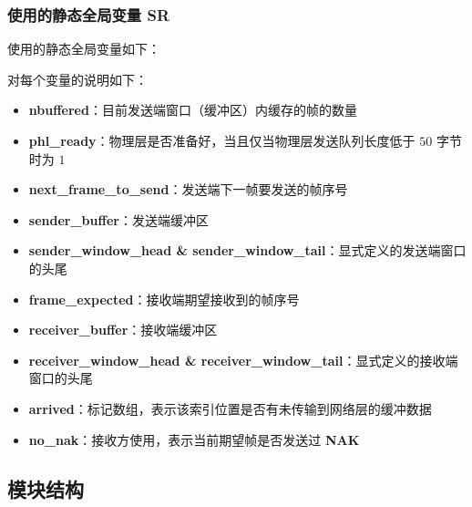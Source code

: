         \subsubsection{使用的静态全局变量 SR}
            \par 使用的静态全局变量如下：
            
            \par 对每个变量的说明如下：
            \begin{itemize}
                \item \textbf{nbuffered}：目前发送端窗口（缓冲区）内缓存的帧的数量
                \item \textbf{phl\_ready}：物理层是否准备好，当且仅当物理层发送队列长度低于 $50$ 字节时为 $1$
                \item \textbf{next\_frame\_to\_send}：发送端下一帧要发送的帧序号
                \item \textbf{sender\_buffer}：发送端缓冲区
                \item \textbf{sender\_window\_head \& sender\_window\_tail}：显式定义的发送端窗口的头尾
                \item \textbf{frame\_expected}：接收端期望接收到的帧序号
                \item \textbf{receiver\_buffer}：接收端缓冲区
                \item \textbf{receiver\_window\_head \& receiver\_window\_tail}：显式定义的接收端窗口的头尾
                \item \textbf{arrived}：标记数组，表示该索引位置是否有未传输到网络层的缓冲数据
                \item \textbf{no\_nak}：接收方使用，表示当前期望帧是否发送过 \textbf{NAK}
            \end{itemize}
            
    \subsection{模块结构}
